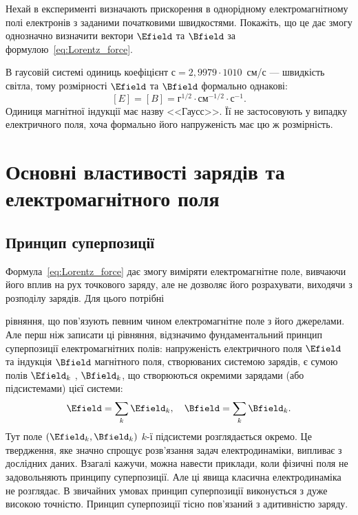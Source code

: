 \begin{problem}\label{prb:1}%
Нехай в експерименті визначають прискорення в однорідному
електромагнітному полі електронів з заданими початковими швидкостями.
Покажіть, що це дає змогу однозначно визначити вектори $\Efield$
та $\Bfield$ за формулою~\eqref{eq:Lorentz_force}.
\end{problem}

В гаусовій системі одиниць коефіцієнт $с = 2,9979⋅1010$~см/с --- швидкість
світла, тому розмірності $\Efield$
та $\Bfield$ формально однакові:
\begin{equation*}
    \left[ E\right]  = \left[ B \right]  = \text{г}^{1/2}\cdot\text{см}^{-1/2}\cdot\text{с}^{-1}.
\end{equation*}
Одиниця магнітної індукції має назву <<Гаусс>>. Її не застосовують у випадку
електричного поля, хоча формально його напруженість має цю ж розмірність.


\section{Основні властивості зарядів та електромагнітного поля}

\subsection*{Принцип суперпозиції}

Формула~\eqref{eq:Lorentz_force} дає змогу виміряти
електромагнітне поле, вивчаючи його вплив на рух точкового заряду, але не
дозволяє його розрахувати, виходячи з розподілу зарядів. Для цього потрібні

рівняння, що пов’язують певним чином електромагнітне поле з його
джерелами. Але перш ніж записати ці рівняння, відзначимо фундаментальний
принцип суперпозиції електромагнітних полів: напруженість електричного
поля $\Efield$ та індукція $\Bfield$ магнітного поля, створюваних системою зарядів, є сумою
полів $\Efield_k$ , $\Bfield_k$, що створюються окремими зарядами (або підсистемами) цієї
системи:
\begin{equation}
    \Efield = \sum\limits_k \Efield_k, \quad \Bfield = \sum\limits_k \Bfield_k.
\end{equation}
 Тут поле $(\Efield_k, \Bfield_k)$ $k$-ї підсистеми розглядається окремо.
 Це твердження, яке значно спрощує розв’язання задач електродинаміки,
випливає з дослідних даних. Взагалі кажучи, можна навести приклади, коли
фізичні поля не задовольняють принципу суперпозиції. Але ці явища класична
електродинаміка не розглядає. В звичайних умовах принцип суперпозиції
виконується з дуже високою точністю. Принцип суперпозиції тісно пов’язаний
з адитивністю заряду.


